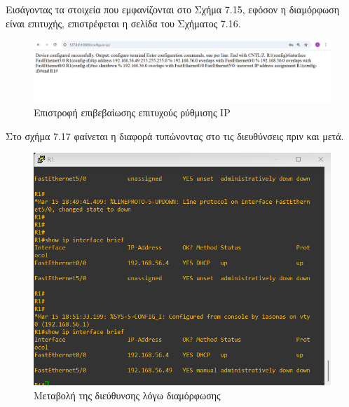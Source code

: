 \FloatBarrier

\noindent Εισάγοντας τα στοιχεία που εμφανίζονται στο Σχήμα 7.15, εφόσον η διαμόρφωση είναι επιτυχής, επιστρέφεται η σελίδα  του Σχήματος 7.16.

\FloatBarrier

\begin{figure}[h]
	\centering
	\includegraphics[width=1.0\textwidth]{graphics/configure_ip_1.png}
	\caption{Επιστροφή επιβεβαίωσης επιτυχούς ρύθμισης IP}
\end{figure}

\FloatBarrier

\noindent Στο σχήμα 7.17 φαίνεται η διαφορά τυπώνοντας στο  τις  διευθύνσεις πριν και μετά.

\FloatBarrier

\begin{figure}[h]
	\centering
	\includegraphics[width=1.0\textwidth]{graphics/ip_difference.png}
	\caption{Μεταβολή της  διεύθυνσης λόγω διαμόρφωσης}
\end{figure}

\FloatBarrier